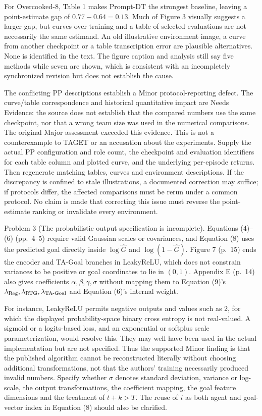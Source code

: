 \documentclass[10pt]{article}
\begin{document}
For Overcooked-8, Table 1 makes Prompt-DT the strongest baseline, leaving a point-estimate gap of \(0.77-0.64=0.13\). Much of Figure 3 visually suggests a larger gap, but curves over training and a table of selected evaluations are not necessarily the same estimand. An old illustrative environment image, a curve from another checkpoint or a table transcription error are plausible alternatives. None is identified in the text. The figure caption and analysis still say five methods while seven are shown, which is consistent with an incompletely synchronized revision but does not establish the cause.\par
The conflicting PP descriptions establish a Minor protocol-reporting defect. The curve/table correspondence and historical quantitative impact are Needs Evidence: the source does not establish that the compared numbers use the same checkpoint, nor that a wrong team size was used in the numerical comparisons. The original Major assessment exceeded this evidence. This is not a counterexample to TAGET or an accusation about the experiments. Supply the actual PP configuration and role count, the checkpoint and evaluation identifiers for each table column and plotted curve, and the underlying per-episode returns. Then regenerate matching tables, curves and environment descriptions. If the discrepancy is confined to stale illustrations, a documented correction may suffice; if protocols differ, the affected comparisons must be rerun under a common protocol. No claim is made that correcting this issue must reverse the point-estimate ranking or invalidate every environment.\par
Problem 3 (The probabilistic output specification is incomplete).  Equations (4)–(6) (pp. 4–5) require valid Gaussian scales or covariances, and Equation (8) uses the predicted goal directly inside \(\log\widehat G\) and \(\log(1-\widehat G)\). Figure 7 (p. 15) ends the encoder and TA-Goal branches in LeakyReLU, which does not constrain variances to be positive or goal coordinates to lie in \((0,1)\). Appendix E (p. 14) also gives coefficients \(\alpha,\beta,\gamma,\sigma\) without mapping them to Equation (9)’s \(\lambda_{\rm Reg},\lambda_{\rm RTG},\lambda_{\rm TA\text{-}Goal}\) and Equation (6)’s internal weight.\par
For instance, LeakyReLU permits negative outputs and values such as 2, for which the displayed probability-space binary cross entropy is not real-valued. A sigmoid or a logits-based loss, and an exponential or softplus scale parameterization, would resolve this. They may well have been used in the actual implementation but are not specified. Thus the supported Minor finding is that the published algorithm cannot be reconstructed literally without choosing additional transformations, not that the authors’ training necessarily produced invalid numbers. Specify whether \(\sigma\) denotes standard deviation, variance or log-scale, the output transformations, the coefficient mapping, the goal feature dimensions and the treatment of \(t+k>T\). The reuse of \(i\) as both agent and goal-vector index in Equation (8) should also be clarified.\par
\end{document}
